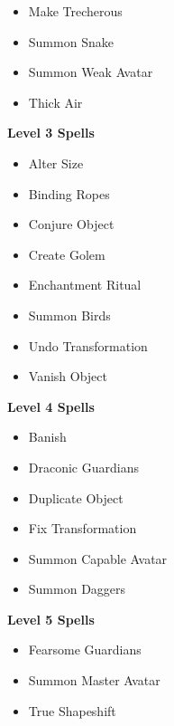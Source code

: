 \begin{multicols}{4}
\begin{itemize}[itemsep=0em]
\item Make Trecherous

\item Summon Snake

\item Summon Weak Avatar

\item Thick Air


\end{itemize}
\textbf{Level 3 Spells}
\begin{itemize}[itemsep=0em]
\renewcommand\labelitemi{-}
\item Alter Size

\item Binding Ropes

\item Conjure Object

\item Create Golem

\item Enchantment Ritual

\item Summon Birds

\item Undo Transformation

\item Vanish Object


\end{itemize}
\textbf{Level 4 Spells}
\begin{itemize}[itemsep=0em]
\renewcommand\labelitemi{-}
\item Banish

\item Draconic Guardians

\item Duplicate Object

\item Fix Transformation

\item Summon Capable Avatar

\item Summon Daggers


\end{itemize}
\textbf{Level 5 Spells}
\begin{itemize}[itemsep=0em]
\renewcommand\labelitemi{-}
\item Fearsome Guardians

\item Summon Master Avatar

\item True Shapeshift



\end{itemize}
\end{multicols}
